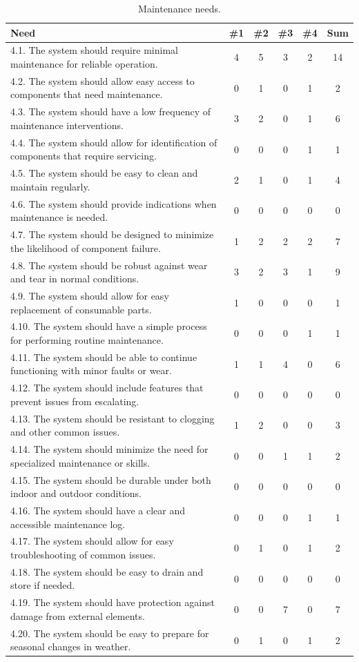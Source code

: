 \documentclass[12pt]{report}
\begin{document}
\begin{table}[H]
\centering
\caption{Maintenance needs.}
\label{table:1d}
\begin{tabular}{|p{10cm}|c|c|c|c|c|}
\hline
\textbf{Need} & \textbf{\#1} & \textbf{\#2} & \textbf{\#3} & \textbf{\#4} & \textbf{Sum} \\
\hline
4.1. The system should require minimal maintenance for reliable operation. & 4 & 5 & 3 & 2 & \cellcolor{yellow}14 \\
4.2. The system should allow easy access to components that need maintenance. & 0 & 1 & 0 & 1 & 2 \\
4.3. The system should have a low frequency of maintenance interventions. & 3 & 2 & 0 & 1 & 6 \\
4.4. The system should allow for identification of components that require servicing. & 0 & 0 & 0 & 1 & 1 \\
4.5. The system should be easy to clean and maintain regularly. & 2 & 1 & 0 & 1 & 4 \\
4.6. The system should provide indications when maintenance is needed. & 0 & 0 & 0 & 0 & 0 \\
4.7. The system should be designed to minimize the likelihood of component failure. & 1 & 2 & 2 & 2 & 7 \\
4.8. The system should be robust against wear and tear in normal conditions. & 3 & 2 & 3 & 1 & \cellcolor{yellow}9 \\
4.9. The system should allow for easy replacement of consumable parts. & 1 & 0 & 0 & 0 & 1 \\
4.10. The system should have a simple process for performing routine maintenance. & 0 & 0 & 0 & 1 & 1 \\
4.11. The system should be able to continue functioning with minor faults or wear. & 1 & 1 & 4 & 0 & 6 \\
4.12. The system should include features that prevent issues from escalating. & 0 & 0 & 0 & 0 & 0 \\
4.13. The system should be resistant to clogging and other common issues. & 1 & 2 & 0 & 0 & 3 \\
4.14. The system should minimize the need for specialized maintenance or skills. & 0 & 0 & 1 & 1 & 2 \\
4.15. The system should be durable under both indoor and outdoor conditions. & 0 & 0 & 0 & 0 & 0 \\
4.16. The system should have a clear and accessible maintenance log. & 0 & 0 & 0 & 1 & 1 \\
4.17. The system should allow for easy troubleshooting of common issues. & 0 & 1 & 0 & 1 & 2 \\
4.18. The system should be easy to drain and store if needed. & 0 & 0 & 0 & 0 & 0 \\
4.19. The system should have protection against damage from external elements. & 0 & 0 & 7 & 0 & 7 \\
4.20. The system should be easy to prepare for seasonal changes in weather. & 0 & 1 & 0 & 1 & 2 \\
\hline
\end{tabular}
\end{table}
\end{document}
